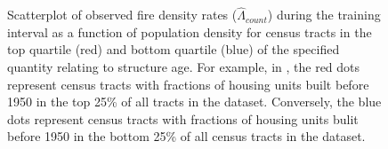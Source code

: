 \documentclass{svjour3}
\begin{document}
\begin{figure}[!htb]
\begin{center}
      \end{center}
      \caption{Scatterplot of observed fire density rates ($\hat\Lambda_{count}$) during the training interval as a function of population density for census tracts in the top quartile (red) and bottom quartile (blue) of the specified quantity relating to structure age. For example, in \protect{}, the red dots represent census tracts with fractions of housing units built before 1950 in the top 25\% of all tracts in the dataset. Conversely, the blue dots represent census tracts with fractions of housing units bulit before 1950 in the bottom 25\% of all census tracts in the dataset.}
     \label{fig:building age}
  \end{figure}
 
 
   \begin{figure}[!htb]
       \begin{center}
\end{center}
\end{figure}
\end{document}
